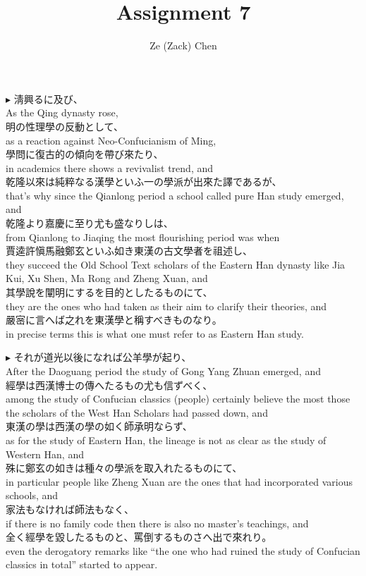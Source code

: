\documentclass{ctexart}
\title{Assignment 7}
\author{Ze (Zack) Chen}
\makeatletter
\newcommand*{\shifttext}[1]{%
  \settowidth{\@tempdima}{#1}%
  \hspace{-\@tempdima}#1%
}
\newcommand{\plabel}[1]{%
\shifttext{\textbf{#1}\quad}%
}
\makeatother
\begin{document}
\maketitle

\plabel{$\blacktriangleright$}%
淸興るに及び、\\
As the Qing dynasty rose,\\
明の性理學の反動として、\\
as a reaction against Neo-Confucianism of Ming,\\
學問に復古的の傾向を帶び來たり、\\
in academics there shows a revivalist trend, and\\
乾隆以來は純粹なる漢學といふ一の學派が出來た譯であるが、\\
that's why since the Qianlong period a school called pure Han study emerged, and\\
乾隆より嘉慶に至り尤も盛なりしは、\\
from Qianlong to Jiaqing the most flourishing period was when\\
賈逵\textperiodcentered 許愼\textperiodcentered 馬融\textperiodcentered 鄭玄といふ如き東漢の古文學者を祖述し、\\
they succeed the Old School Text scholars of the Eastern Han dynasty like Jia Kui, Xu Shen, Ma Rong and Zheng Xuan, and\\
其學說を闡明にするを目的としたるものにて、\\
they are the ones who had taken as their aim to clarify their theories, and\\
嚴宻に言へば之れを東漢學と稱すべきものなり。\\
in precise terms this is what one must refer to as Eastern Han study.

\vspace{1em}
\plabel{$\blacktriangleright$}%
それが道光以後になれば公羊學が起り、\\
After the Daoguang period the study of Gong Yang Zhuan emerged, and\\
經學は西漢博士の傳へたるもの尤も信ずべく、\\
among the study of Confucian classics (people) certainly believe the most those the scholars of the West Han Scholars had passed down, and\\
東漢の學は西漢の學の如く師承明ならず、\\
as for the study of Eastern Han, the lineage is not as clear as the study of Western Han, and\\
殊に鄭玄の如きは種々の學派を取入れたるものにて、\\
in particular people like Zheng Xuan are the ones that had incorporated various schools, and\\
家法もなければ師法もなく、\\
if there is no family code then there is also no master's teachings, and\\
全く經學を毀したるものと、罵倒するものさへ出で來れり。\\
even the derogatory remarks like ``the one who had ruined the study of Confucian classics in total'' started to appear.
\end{document}
